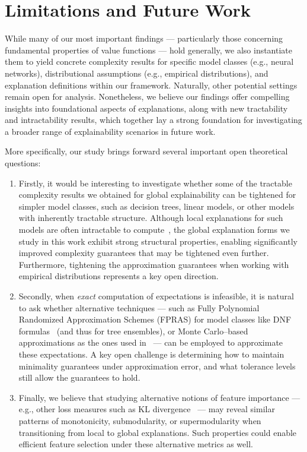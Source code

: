 \documentclass{article}
\begin{document}
\section{Limitations and Future Work}
While many of our most important findings --- particularly those concerning fundamental properties of value functions --- hold generally, we also instantiate them to yield concrete complexity results for specific model classes (e.g., neural networks), distributional assumptions (e.g., empirical distributions), and explanation definitions within our framework. Naturally, other potential settings remain open for analysis. Nonetheless, we believe our findings offer compelling insights into foundational aspects of explanations, along with new tractability and intractability results, which together lay a strong foundation for investigating a broader range of explainability scenarios in future work.

More specifically, our study brings forward several important open theoretical questions:

\begin{enumerate}
\item Firstly, it would be interesting to investigate whether some of the tractable complexity results we obtained for global explainability can be tightened for simpler model classes, such as decision trees, linear models, or other models with inherently tractable structure. Although local explanations for such models are often intractable to compute~\citep{arenas2022computing, subercaseaux2024probabilistic}, the global explanation forms we study in this work exhibit strong structural properties, enabling significantly improved complexity guarantees that may be tightened even further. Furthermore, tightening the approximation guarantees when working with empirical distributions represents a key open direction.
\item Secondly, when \emph{exact} computation of expectations is infeasible, it is natural to ask whether alternative techniques --- such as Fully Polynomial Randomized Approximation Schemes (FPRAS) for model classes like DNF formulas~\citep{meel2019not} (and thus for tree ensembles), or Monte Carlo–based approximations as the ones used in~\citep{subercaseaux2024probabilistic} --- can be employed to approximate these expectations. A key open challenge is determining how to maintain minimality guarantees under approximation error, and what tolerance levels still allow the guarantees to hold.
\item Finally, we believe that studying alternative notions of feature importance --- e.g., other loss measures such as KL divergence~\citep{conmy2023towards} --- may reveal similar patterns of monotonicity, submodularity, or supermodularity when transitioning from local to global explanations. Such properties could enable efficient feature selection under these alternative metrics as well.
\end{enumerate}
\end{document}
